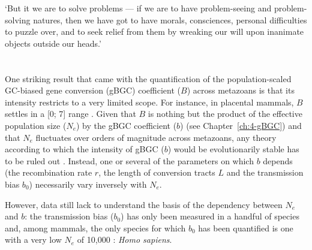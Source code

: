 \begin{savequote}[8cm]
‘But it we are to solve problems — if we are to have problem-seeing and problem-solving natures, then we have got to have morals, consciences, personal difficulties to puzzle over, and to seek relief from them by wreaking our will upon inanimate objects outside our heads.’

\end{savequote}

\chapter*{\label{ch:objectives}}



One striking result that came with the quantification of the population-scaled GC-biased gene conversion (gBGC) coefficient ($B$) across metazoans \citep{galtier2018codon} is that its intensity restricts to a very limited scope.
For instance, in placental mammals, $B$ settles in a [0; 7] range \citep{lartillot2013phylogenetic}.
Given that $B$ is nothing but the product of the effective population size ($N_e$) by the gBGC coefficient ($b$) (see Chapter~\ref{ch:4-gBGC}) and that $N_e$ fluctuates over orders of magnitude across metazoans, any theory according to which the intensity of gBGC ($b$) would be evolutionarily stable has to be ruled out \citep{galtier2018codon}.
Instead, one or several of the parameters on which $b$ depends (the recombination rate $r$, the length of conversion tracts $L$ and the transmission bias $b_0$) necessarily vary inversely with $N_e$.

However, data still lack to understand the basis of the dependency between $N_e$ and $b$: the transmission bias ($b_0$) has only been measured in a handful of species \citep{mancera2008highresolution, si2015widely, williams2015noncrossover, halldorsson2016rate, keith2016high, smeds2016highresolution} and, among mammals, the only species for which $b_0$ has been quantified is one with a very low $N_e$ of 10,000 \citep{takahata1993allelic,erlich1996hla,harding1997archaic,charlesworth2009fundamental,yu2004nucleotide}: \textit{Homo sapiens}.

